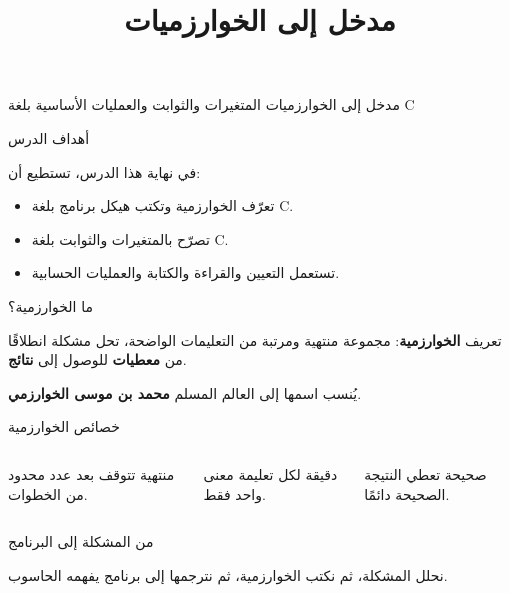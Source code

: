 \documentclass[aspectratio=169, 11pt, t, xcolor={table}]{beamer}
\title{مدخل إلى الخوارزميات}
\begin{document}
{مدخل إلى الخوارزميات}
{المتغيرات والثوابت والعمليات الأساسية بلغة \textenglish{C}}

\begin{frame}{أهداف الدرس}
    \begin{tbox}{\faBullseye\quad في نهاية هذا الدرس، تستطيع أن:}
        \begin{itemize}
            \item تعرّف الخوارزمية وتكتب هيكل برنامج بلغة \textenglish{C}.
            \item تصرّح بالمتغيرات والثوابت بلغة \textenglish{C}.
            \item تستعمل التعيين والقراءة والكتابة والعمليات الحسابية.
        \end{itemize}
    \end{tbox}
\end{frame}

\begin{frame}{ما الخوارزمية؟}
    \begin{tbox}{\faLightbulb\quad تعريف}
        \textbf{الخوارزمية}: مجموعة منتهية ومرتبة من التعليمات الواضحة،
        تحل مشكلة انطلاقًا من \textbf{معطيات} للوصول إلى \textbf{نتائج}.
    \end{tbox}
    يُنسب اسمها إلى العالم المسلم \textbf{محمد بن موسى الخوارزمي}.
\end{frame}

\begin{frame}{خصائص الخوارزمية}
    \vspace{0.6cm}
    \begin{columns}[T]
        \begin{card}{منتهية}
            تتوقف بعد عدد محدود من الخطوات.
        \end{card}
        \begin{card}{دقيقة}
            لكل تعليمة معنى واحد فقط.
        \end{card}
        \begin{card}{صحيحة}
            تعطي النتيجة الصحيحة دائمًا.
        \end{card}
    \end{columns}
\end{frame}

\begin{frame}{من المشكلة إلى البرنامج}
    \vspace{0.8cm}
    \begin{center}
    \end{center}
    \vspace{0.4cm}
    نحلل المشكلة، ثم نكتب الخوارزمية، ثم نترجمها إلى برنامج يفهمه الحاسوب.
\end{frame}
\end{document}
